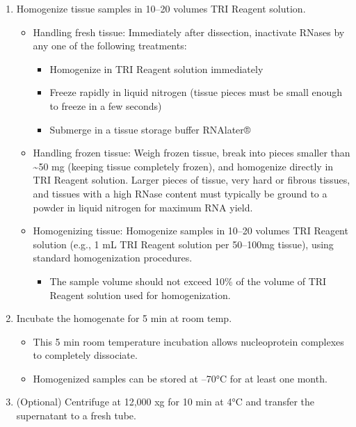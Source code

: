 \documentclass[
  letterpaper,
  DIV=11,
  numbers=noendperiod]{scrreprt}
\providecommand{\tightlist}{%
  \setlength{\itemsep}{0pt}\setlength{\parskip}{0pt}}\usepackage{longtable,booktabs,array}
\begin{document}
\begin{enumerate}
\def\labelenumi{\arabic{enumi}.}
\item
  Homogenize tissue samples in 10--20 volumes TRI Reagent solution.

  \begin{itemize}
  \item
    Handling fresh tissue: Immediately after dissection, inactivate
    RNases by any one of the following treatments:

    \begin{itemize}
    \item
      Homogenize in TRI Reagent solution immediately
    \item
      Freeze rapidly in liquid nitrogen (tissue pieces must be small
      enough to freeze in a few seconds)
    \item
      Submerge in a tissue storage buffer RNAlater®
    \end{itemize}
  \item
    Handling frozen tissue: Weigh frozen tissue, break into pieces
    smaller than \textasciitilde50 mg (keeping tissue completely
    frozen), and homogenize directly in TRI Reagent solution. Larger
    pieces of tissue, very hard or fibrous tissues, and tissues with a
    high RNase content must typically be ground to a powder in liquid
    nitrogen for maximum RNA yield.
  \item
    Homogenizing tissue: Homogenize samples in 10--20 volumes TRI
    Reagent solution (e.g., 1 mL TRI Reagent solution per 50--100mg
    tissue), using standard homogenization procedures.

    \begin{itemize}
    \tightlist
    \item
      The sample volume should not exceed 10\% of the volume of TRI
      Reagent solution used for homogenization.
    \end{itemize}
  \end{itemize}
\item
  Incubate the homogenate for 5 min at room temp.

  \begin{itemize}
  \item
    This 5 min room temperature incubation allows nucleoprotein
    complexes to completely dissociate.
  \item
    Homogenized samples can be stored at --70°C for at least one month.
  \end{itemize}
\item
  (Optional) Centrifuge at 12,000 xg for 10 min at 4°C and transfer the
  supernatant to a fresh tube.


\end{enumerate}
\end{document}
